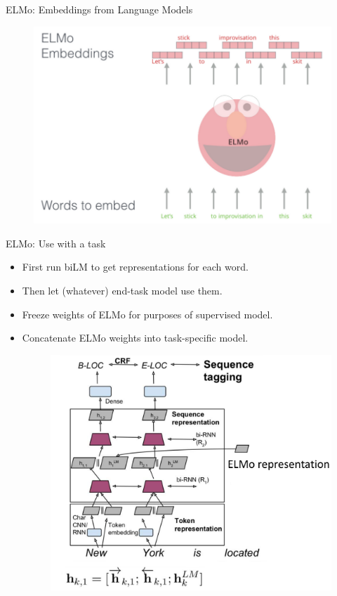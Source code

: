 \documentclass[handout]{beamer}
\begin{document}
\begin{frame}{ELMo: Embeddings from Language Models}
    \begin{figure}[h]
        	\includegraphics[scale = 0.29]{pics/elmo.png}
        \end{figure}  
\end{frame}



\begin{frame}{ELMo: Use with a task}
\begin{scriptsize}
\begin{itemize}
\item First run biLM to get representations for each word.
\item Then let (whatever) end-task model use them.
\item  Freeze weights of ELMo for purposes of supervised model.
\item  Concatenate ELMo weights into task-specific model.


    \begin{figure}[h]
        	\includegraphics[scale = 0.25]{pics/elmo2.png}
        \end{figure}  

 

\end{itemize}
\end{scriptsize}
\end{frame}
\end{document}
